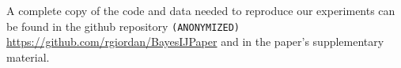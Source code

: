 

A complete copy of the code and data needed to reproduce our
experiments can be found in the github repository
 {
    \texttt{(ANONYMIZED)}
} {
    \url{https://github.com/rgiordan/BayesIJPaper}
}
and in the paper's supplementary material.
